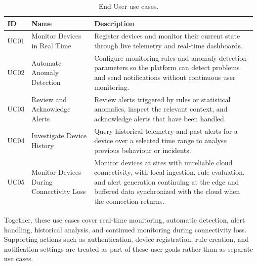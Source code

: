\begin{table}[htbp]
    \centering
    \caption{End User use cases.}
    \label{tab:uc-end-user}
    \small
    \begin{tabularx}{\textwidth}{l l X}
        \toprule
        \textbf{ID} & \textbf{Name}                            & \textbf{Description}                                                                                                                                                                                                                                  \\
        \midrule
        UC01        & Monitor Devices in Real Time             & Register devices and monitor their current state through live telemetry and real-time dashboards.                                                                                                                                         \\
        UC02        & Automate Anomaly Detection               & Configure monitoring rules and anomaly detection parameters so the platform can detect problems and send notifications without continuous user monitoring.                                                                                \\
        UC03        & Review and Acknowledge Alerts            & Review alerts triggered by rules or statistical anomalies, inspect the relevant context, and acknowledge alerts that have been handled.                                                                                                \\
        UC04        & Investigate Device History               & Query historical telemetry and past alerts for a device over a selected time range to analyse previous behaviour or incidents.                                                                                                           \\
        UC05        & Monitor Devices During Connectivity Loss & Monitor devices at sites with unreliable cloud connectivity, with local ingestion, rule evaluation, and alert generation continuing at the edge and buffered data synchronized with the cloud when the connection returns.             \\
        \bottomrule
    \end{tabularx}
\end{table}

Together, these use cases cover real-time monitoring, automatic detection, alert handling, historical analysis, and continued monitoring during connectivity loss. Supporting actions such as authentication, device registration, rule creation, and notification settings are treated as part of these user goals rather than as separate use cases.
